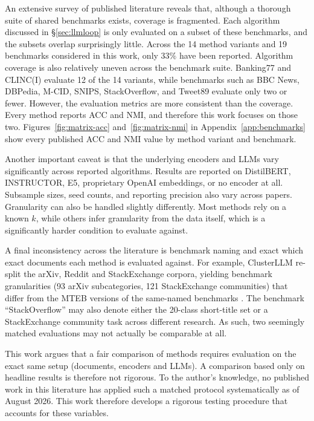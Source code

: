 \documentclass[11pt,a4paper,oneside]{report}
\begin{document}
An extensive survey of published literature reveals that, although a thorough suite of shared benchmarks exists, coverage is fragmented. Each algorithm discussed in \S\ref{sec:llmloop} is only evaluated on a subset of these benchmarks, and the subsets overlap surprisingly little. Across the 14 method variants and 19 benchmarks considered in this work, only $33\%$ have been reported. Algorithm coverage is also relatively uneven across the benchmark suite. Banking77 and CLINC(I) evaluate 12 of the 14 variants, while benchmarks such as BBC News, DBPedia, M-CID, SNIPS, StackOverflow, and Tweet89 evaluate only two or fewer. However, the evaluation metrics are more consistent than the coverage. Every method reports ACC and NMI, and therefore this work focuses on those two. Figures~\ref{fig:matrix-acc} and~\ref{fig:matrix-nmi} in Appendix~\ref{app:benchmarks} show every published ACC and NMI value by method variant and benchmark.

Another important caveat is that the underlying encoders and LLMs vary significantly across reported algorithms. Results are reported on DistilBERT, INSTRUCTOR, E5, proprietary OpenAI embeddings, or no encoder at all. Subsample sizes, seed counts, and reporting precision also vary across papers. Granularity can also be handled slightly differently. Most methods rely on a known $k$, while others infer granularity from the data itself, which is a significantly harder condition to evaluate against.

A final inconsistency across the literature is benchmark naming and exact which exact documents each method is evaluated against. For example, ClusterLLM re-split the arXiv, Reddit and StackExchange corpora, yielding benchmark granularities (93 arXiv subcategories, 121 StackExchange communities) that differ from the MTEB versions of the same-named benchmarks \citep{zhang2023clusterllm}. The benchmark ``StackOverflow'' may also denote either the 20-class short-title set \citep{xu2017selftaught} or a StackExchange community task across different research. As such, two seemingly matched evaluations may not actually be comparable at all.

This work argues that a fair comparison of methods requires evaluation on the exact same setup (documents, encoders and LLMs). A comparison based only on headline results is therefore not rigorous. To the author's knowledge, no published work in this literature has applied such a matched protocol systematically as of August 2026. This work therefore develops a rigorous testing procedure that accounts for these variables.
\end{document}
